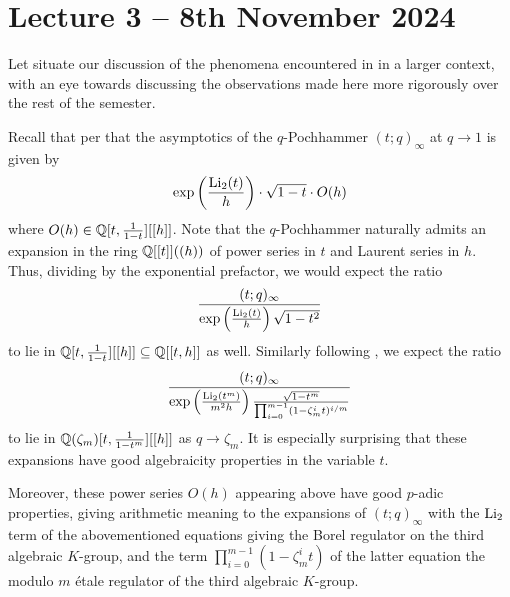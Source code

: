 \section{Lecture 3 -- 8th November 2024}\label{sec: lecture 3}
Let situate our discussion of the phenomena encountered in  in a larger context, with an eye towards discussing the observations made here more rigorously over the rest of the semester.

Recall that per  that the asymptotics of the $q$-Pochhammer $(t;q)_{\infty}$ at $q\to 1$ is given by 
$$\exp\left(\frac{\mathrm{Li}_{2}(t)}{h}\right)\cdot\sqrt{1-t}\cdot O(h)$$
where $O(h)\in\mathbb{Q}[t,\frac{1}{1-t}][[h]]$. Note that the $q$-Pochhammer naturally admits an expansion in the ring $\mathbb{Q}[[t]]((h))$ of power series in $t$ and Laurent series in $h$. Thus, dividing by the exponential prefactor, we would expect the ratio 
$$\frac{(t;q)_{\infty}}{\exp\left(\frac{\mathrm{Li}_{2}(t)}{h}\right)\sqrt{1-t^{2}}}$$
to lie in $\mathbb{Q}[t,\frac{1}{1-t}][[h]]\subseteq\mathbb{Q}[[t,h]]$ as well. Similarly following , we expect the ratio 
$$\frac{(t;q)_{\infty}}{\exp\left(\frac{\mathrm{Li}_{2}(t^{m})}{m^{2}h}\right)\frac{\sqrt{1-t^{m}}}{\prod_{i=0}^{m-1}(1-\zeta_{m}^{i}t)^{i/m}}}$$
to lie in $\mathbb{Q}(\zeta_{m})[t,\frac{1}{1-t^{m}}][[h]]$ as $q\to\zeta_{m}$. It is especially surprising that these expansions have good algebraicity properties in the variable $t$.  

Moreover, these power series $O(h)$ appearing above have good $p$-adic properties, giving arithmetic meaning to the expansions of $(t;q)_{\infty}$ with the $\mathrm{Li}_{2}$ term of the abovementioned equations giving the Borel regulator on the third algebraic $K$-group, and the term $\prod_{i=0}^{m-1}(1-\zeta_{m}^{i}t)$ of the latter equation the modulo $m$ \'{e}tale regulator of the third algebraic $K$-group. 

